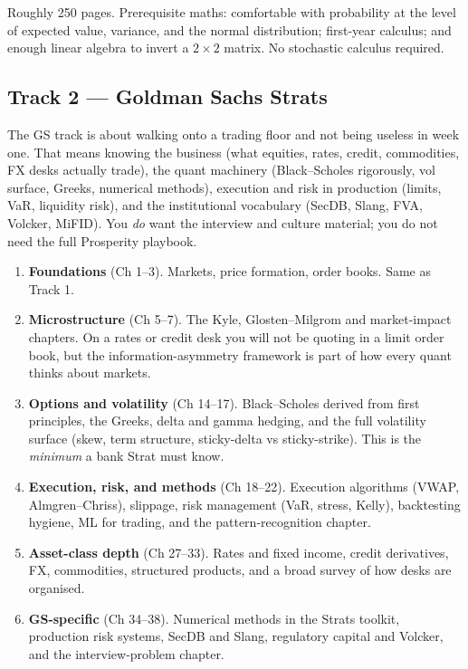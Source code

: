 Roughly 250 pages. Prerequisite maths: comfortable with probability at
the level of expected value, variance, and the normal distribution;
first-year calculus; and enough linear algebra to invert a $2\times 2$
matrix. No stochastic calculus required.

\subsection{Track 2 --- Goldman Sachs Strats}

The GS track is about walking onto a trading floor and not being
useless in week one. That means knowing the business (what equities,
rates, credit, commodities, FX desks actually trade), the quant
machinery (Black--Scholes rigorously, vol surface, Greeks, numerical
methods), execution and risk in production (limits, VaR, liquidity
risk), and the institutional vocabulary (SecDB, Slang, FVA, Volcker,
MiFID). You \emph{do} want the interview and culture material; you do
not need the full Prosperity playbook.

\begin{enumerate}
  \item \textbf{Foundations} (Ch 1--3). Markets, price formation,
        order books. Same as Track 1.
  \item \textbf{Microstructure} (Ch 5--7). The Kyle, Glosten--Milgrom
        and market-impact chapters. On a rates or credit desk you
        will not be quoting in a limit order book, but the
        information-asymmetry framework is part of how every quant
        thinks about markets.
  \item \textbf{Options and volatility} (Ch 14--17). Black--Scholes
        derived from first principles, the Greeks, delta and gamma
        hedging, and the full volatility surface (skew, term
        structure, sticky-delta vs sticky-strike). This is the
        \emph{minimum} a bank Strat must know.
  \item \textbf{Execution, risk, and methods} (Ch 18--22). Execution
        algorithms (VWAP, Almgren--Chriss), slippage, risk management
        (VaR, stress, Kelly), backtesting hygiene, ML for trading,
        and the pattern-recognition chapter.
  \item \textbf{Asset-class depth} (Ch 27--33). Rates and fixed
        income, credit derivatives, FX, commodities, structured
        products, and a broad survey of how desks are organised.
  \item \textbf{GS-specific} (Ch 34--38). Numerical methods in the
        Strats toolkit, production risk systems, SecDB and Slang,
        regulatory capital and Volcker, and the interview-problem
        chapter.
\end{enumerate}

